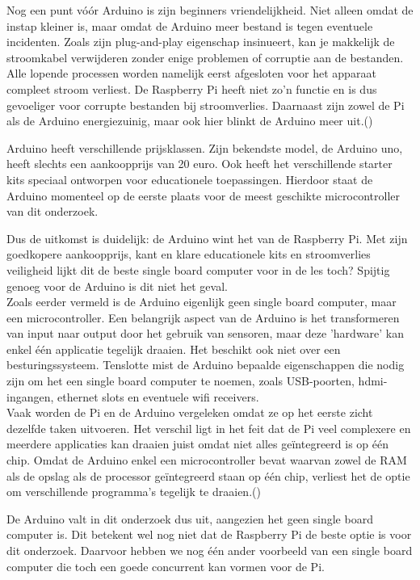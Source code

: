 Nog een punt vóór Arduino is zijn beginners vriendelijkheid. Niet alleen omdat de instap kleiner is, maar omdat de Arduino meer bestand is tegen eventuele incidenten. Zoals zijn plug-and-play eigenschap insinueert, kan je makkelijk de stroomkabel verwijderen zonder enige problemen of corruptie aan de bestanden. Alle lopende processen worden namelijk eerst afgesloten voor het apparaat compleet stroom verliest. De Raspberry Pi heeft niet zo’n functie en is dus gevoeliger voor corrupte bestanden bij stroomverlies. Daarnaast zijn zowel de Pi als de Arduino energiezuinig, maar ook hier blinkt de Arduino meer uit.(\cite{Teja2021})

Arduino heeft verschillende prijsklassen. Zijn bekendste model, de Arduino uno, heeft slechts een aankoopprijs van 20 euro. Ook heeft het verschillende starter kits speciaal ontworpen voor educationele toepassingen. Hierdoor staat de Arduino momenteel op de eerste plaats voor de meest geschikte microcontroller van dit onderzoek.

Dus de uitkomst is duidelijk: de Arduino wint het van de Raspberry Pi. Met zijn goedkopere aankoopprijs, kant en klare educationele kits en stroomverlies veiligheid lijkt dit de beste single board computer voor in de les toch? Spijtig genoeg voor de Arduino is dit niet het geval.\\ 

Zoals eerder vermeld is de Arduino eigenlijk geen single board computer, maar een microcontroller. Een belangrijk aspect van de Arduino is het transformeren van input naar output door het gebruik van sensoren, maar deze 'hardware' kan enkel één applicatie tegelijk draaien. Het beschikt ook niet over een besturingssysteem. Tenslotte mist de Arduino bepaalde eigenschappen die nodig zijn om het een single board computer te noemen, zoals USB-poorten, hdmi-ingangen, ethernet slots en eventuele wifi receivers.\\

Vaak worden de Pi en de Arduino vergeleken omdat ze op het eerste zicht dezelfde taken uitvoeren. Het verschil ligt in het feit dat de Pi veel complexere en meerdere applicaties kan draaien juist omdat niet alles geïntegreerd is op één chip. Omdat de Arduino enkel een microcontroller bevat waarvan zowel de RAM als de opslag als de processor geïntegreerd staan op één chip, verliest het de optie om verschillende programma’s tegelijk te draaien.(\cite{Teja2021,Keim2019,FreeCodeCamp2017})

De Arduino valt in dit onderzoek dus uit, aangezien het geen single board computer is. Dit betekent wel nog niet dat de Raspberry Pi de beste optie is voor dit onderzoek. Daarvoor hebben we nog één ander voorbeeld van een single board computer die toch een goede concurrent kan vormen voor de Pi. 


